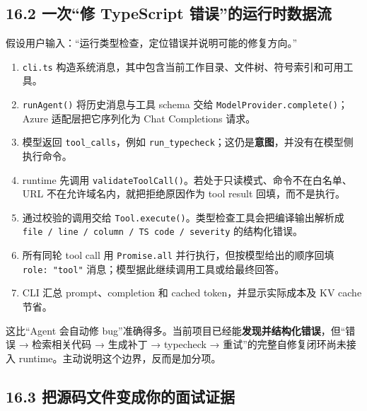 \subsection{16.2 一次“修 TypeScript 错误”的运行时数据流}

假设用户输入：“运行类型检查，定位错误并说明可能的修复方向。”

\begin{enumerate}[leftmargin=2em]
\item \texttt{cli.ts} 构造系统消息，其中包含当前工作目录、文件树、符号索引和可用工具。
\item \texttt{runAgent()} 将历史消息与工具 schema 交给 \texttt{ModelProvider.complete()}；Azure 适配层把它序列化为 Chat Completions 请求。
\item 模型返回 \texttt{tool\_calls}，例如 \texttt{run\_typecheck}；这仍是\textbf{意图}，并没有在模型侧执行命令。
\item runtime 先调用 \texttt{validateToolCall()}。若处于只读模式、命令不在白名单、URL 不在允许域名内，就把拒绝原因作为 tool result 回填，而不是执行。
\item 通过校验的调用交给 \texttt{Tool.execute()}。类型检查工具会把编译输出解析成 \texttt{file / line / column / TS code / severity} 的结构化错误。
\item 所有同轮 tool call 用 \texttt{Promise.all} 并行执行，但按模型给出的顺序回填 \texttt{role: "tool"} 消息；模型据此继续调用工具或给最终回答。
\item CLI 汇总 prompt、completion 和 cached token，并显示实际成本及 KV cache 节省。
\end{enumerate}

这比“Agent 会自动修 bug”准确得多。当前项目已经能\textbf{发现并结构化错误}，但“错误 → 检索相关代码 → 生成补丁 → typecheck → 重试”的完整自修复闭环尚未接入 runtime。主动说明这个边界，反而是加分项。

\subsection{16.3 把源码文件变成你的面试证据}

